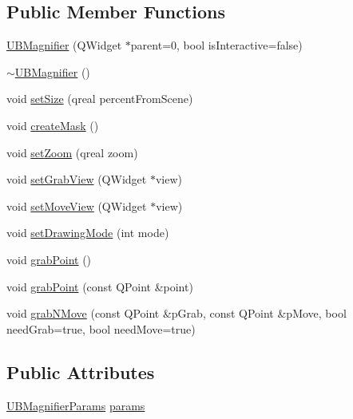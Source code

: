 \subsection*{Public Member Functions}
\begin{DoxyCompactItemize}
\item 
\hyperlink{class_u_b_magnifier_ae59609ee73c99d0246a9543d5fac4dfe}{U\-B\-Magnifier} (Q\-Widget $\ast$parent=0, bool is\-Interactive=false)
\item 
\hyperlink{class_u_b_magnifier_ac5d485a5a6d625b6043a082623ce92ac}{$\sim$\-U\-B\-Magnifier} ()
\item 
void \hyperlink{class_u_b_magnifier_a71d0210735effe31a9adeb1fd96e159b}{set\-Size} (qreal percent\-From\-Scene)
\item 
void \hyperlink{class_u_b_magnifier_a37cec734cbca86307ba301aff679faab}{create\-Mask} ()
\item 
void \hyperlink{class_u_b_magnifier_ab743216a271eb539ee225270c49207ce}{set\-Zoom} (qreal zoom)
\item 
void \hyperlink{class_u_b_magnifier_a1fe23f2b7bffb592b7e5946137761c2c}{set\-Grab\-View} (Q\-Widget $\ast$view)
\item 
void \hyperlink{class_u_b_magnifier_ac64314a8ead26579a13f89dc195e0549}{set\-Move\-View} (Q\-Widget $\ast$view)
\item 
void \hyperlink{class_u_b_magnifier_a00499d30e969d31228200bcfc1a68927}{set\-Drawing\-Mode} (int mode)
\item 
void \hyperlink{class_u_b_magnifier_a473a5f6edebf14a67f0d71fba84738c8}{grab\-Point} ()
\item 
void \hyperlink{class_u_b_magnifier_a28078a458cf1473db6add22f085f49da}{grab\-Point} (const Q\-Point \&point)
\item 
void \hyperlink{class_u_b_magnifier_a7c812efaba0f2f45dce91f7984f30dc3}{grab\-N\-Move} (const Q\-Point \&p\-Grab, const Q\-Point \&p\-Move, bool need\-Grab=true, bool need\-Move=true)
\end{DoxyCompactItemize}
\subsection*{Public Attributes}
\begin{DoxyCompactItemize}
\item 
\hyperlink{class_u_b_magnifier_params}{U\-B\-Magnifier\-Params} \hyperlink{class_u_b_magnifier_a6f32761f0d49639be70522952a36b671}{params}
\end{DoxyCompactItemize}
